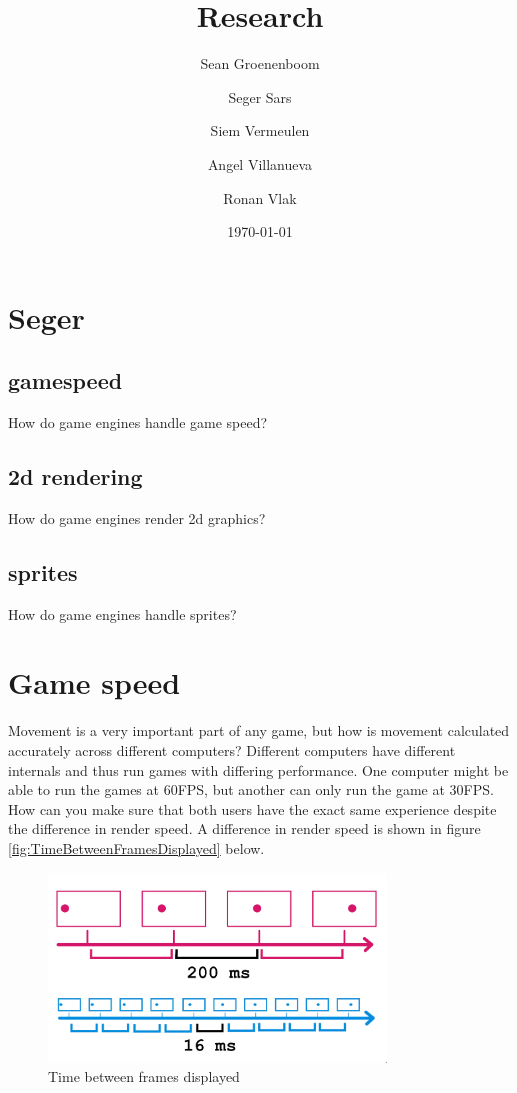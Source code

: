 \documentclass{article} %
\title{Research} %
\author{Sean Groenenboom \and Seger Sars \and Siem Vermeulen \and Angel Villanueva \and Ronan Vlak} %
\date{\today} %
\begin{document}
\maketitle %
\newpage

\tableofcontents %
\newpage

\section{Seger}

\subsection{gamespeed}
How do game engines handle game speed?
\subsection{2d rendering}
How do game engines render 2d graphics?
\subsection{sprites}
How do game engines handle sprites?
\newpage
\section{Game speed}
Movement is a very important part of any game, but how is movement calculated accurately across different computers?
Different computers have different internals and thus run games with differing performance.
One computer might be able to run the games at 60FPS, but another can only run the game at 30FPS.
How can you make sure that both users have the exact same experience despite the difference in render speed.
A difference in render speed is shown in figure \autoref{fig:TimeBetweenFramesDisplayed} below.
\begin{figure}[h!]
    \centering
    \includegraphics[width=0.8\textwidth]{time_between_frames.png}
    \caption{Time between frames displayed}
    \label{fig:TimeBetweenFramesDisplayed}
\end{figure}
\end{document}
